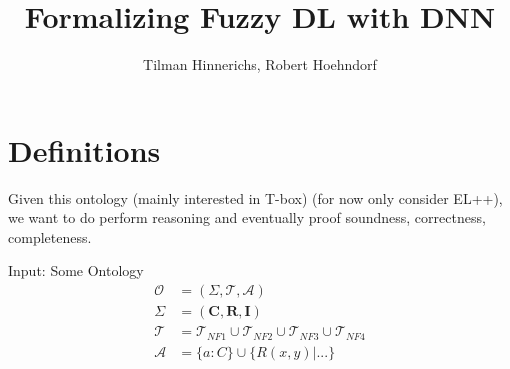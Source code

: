 \documentclass[]{article}
\title{Formalizing Fuzzy DL with DNN}
\author{Tilman Hinnerichs, Robert Hoehndorf}
\date{}
\begin{document}
\maketitle

\section{Definitions}

Given this ontology (mainly interested in T-box) (for now only consider EL++), we want to do perform reasoning and eventually proof soundness, correctness, completeness. 

Input: Some Ontology
\begin{align*}
	\mathcal{O}&=(\Sigma,\mathcal{T,A})\\
	\Sigma &=(\mathbf{C,R,I})\\
	\mathcal{T} &= \mathcal{T}_{NF1} \cup \mathcal{T}_{NF2} \cup \mathcal{T}_{NF3} \cup \mathcal{T}_{NF4}\\
	\mathcal{A}&=\{a:C\} \cup \{ R(x,y) | ... \}
\end{align*}
\end{document}
